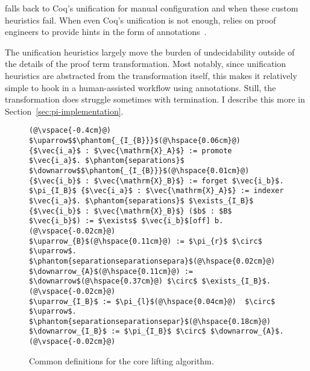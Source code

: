\toolnamec falls back to Coq's unification for manual configuration and when these custom heuristics fail.
When even Coq's unification is not enough, \toolnamec relies on proof engineers to provide hints
in the form of annotations~\href{https://github.com/uwplse/pumpkin-pi/blob/v2.0.0/plugin/coq/nonorn.v}{}.

The unification heuristics largely move the burden of undecidability outside of the details of the proof term transformation.
Most notably, since unification heuristics are abstracted from the transformation itself,
this makes it relatively simple to hook in a human-assisted workflow using annotations.
Still, the \toolnamec transformation does struggle sometimes with termination.
I describe this more in Section~\ref{sec:pi-implementation}.

\iffalse
\begin{figure}
\begin{lstlisting}
(@\vspace{-0.4cm}@)
$\uparrow$$\phantom{_{I_{B}}}$(@\hspace{0.06cm}@) {$\vec{i_a}$ : $\vec{\mathrm{X}_A}$} := promote $\vec{i_a}$. $\phantom{separations}$ $\downarrow$$\phantom{_{I_{B}}}$(@\hspace{0.01cm}@) {$\vec{i_b}$ : $\vec{\mathrm{X}_B}$} := forget $\vec{i_b}$.
$\pi_{I_B}$ {$\vec{i_a}$ : $\vec{\mathrm{X}_A}$} := indexer $\vec{i_a}$. $\phantom{separations}$ $\exists_{I_B}$ {$\vec{i_b}$ : $\vec{\mathrm{X}_B}$} ($b$ : $B$ $\vec{i_b}$) := $\exists$ $\vec{i_b}$[off] b.(@\vspace{-0.02cm}@)
$\uparrow_{B}$(@\hspace{0.11cm}@) := $\pi_{r}$ $\circ$ $\uparrow$. $\phantom{separationseparationsepara}$(@\hspace{0.02cm}@) $\downarrow_{A}$(@\hspace{0.11cm}@) := $\downarrow$(@\hspace{0.37cm}@) $\circ$ $\exists_{I_B}$.(@\vspace{-0.02cm}@)
$\uparrow_{I_B}$ := $\pi_{l}$(@\hspace{0.04cm}@)  $\circ$ $\uparrow$. $\phantom{separationseparationsepar}$(@\hspace{0.18cm}@) $\downarrow_{I_B}$ := $\pi_{I_B}$ $\circ$ $\downarrow_{A}$.(@\vspace{-0.02cm}@)
\end{lstlisting}
\vspace{-0.3cm}
\caption{Common definitions for the core lifting algorithm.}
\label{fig:convenience}
\end{figure}

